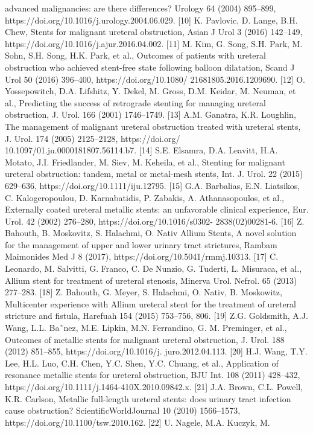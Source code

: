 advanced malignancies: are there differences? Urology 64 (2004) 895–899, https://doi.org/10.1016/j.urology.2004.06.029. [10] K. Pavlovic, D. Lange, B.H. Chew, Stents for malignant ureteral obstruction, Asian J Urol 3 (2016) 142–149, https://doi.org/10.1016/j.ajur.2016.04.002. [11] M. Kim, G. Song, S.H. Park, M. Sohn, S.H. Song, H.K. Park, et al., Outcomes of patients with ureteral obstruction who achieved stent-free state following balloon dilatation, Scand J Urol 50 (2016) 396–400, https://doi.org/10.1080/ 21681805.2016.1209690. [12] O. Yossepowitch, D.A. Lifshitz, Y. Dekel, M. Gross, D.M. Keidar, M. Neuman, et al., Predicting the success of retrograde stenting for managing ureteral obstruction, J. Urol. 166 (2001) 1746–1749. [13] A.M. Ganatra, K.R. Loughlin, The management of malignant ureteral obstruction treated with ureteral stents, J. Urol. 174 (2005) 2125–2128, https://doi.org/ 10.1097/01.ju.0000181807.56114.b7. [14] S.E. Elsamra, D.A. Leavitt, H.A. Motato, J.I. Friedlander, M. Siev, M. Keheila, et al., Stenting for malignant ureteral obstruction: tandem, metal or metal-mesh stents, Int. J. Urol. 22 (2015) 629–636, https://doi.org/10.1111/iju.12795. [15] G.A. Barbalias, E.N. Liatsikos, C. Kalogeropoulou, D. Karnabatidis, P. Zabakis, A. Athanasopoulos, et al., Externally coated ureteral metallic stents: an unfavorable clinical experience, Eur. Urol. 42 (2002) 276–280, https://doi.org/10.1016/s0302- 2838(02)00281-6. [16] Z. Bahouth, B. Moskovitz, S. Halachmi, O. Nativ Allium Stents, A novel solution for the management of upper and lower urinary tract strictures, Rambam Maimonides Med J 8 (2017), https://doi.org/10.5041/rmmj.10313. [17] C. Leonardo, M. Salvitti, G. Franco, C. De Nunzio, G. Tuderti, L. Misuraca, et al., Allium stent for treatment of ureteral stenosis, Minerva Urol. Nefrol. 65 (2013) 277–283. [18] Z. Bahouth, G. Meyer, S. Halachmi, O. Nativ, B. Moskowitz, Multicenter experience with Allium ureteral stent for the treatment of ureteral stricture and fistula, Harefuah 154 (2015) 753–756, 806. [19] Z.G. Goldsmith, A.J. Wang, L.L. Ba˜nez, M.E. Lipkin, M.N. Ferrandino, G. M. Preminger, et al., Outcomes of metallic stents for malignant ureteral obstruction, J. Urol. 188 (2012) 851–855, https://doi.org/10.1016/j. juro.2012.04.113. [20] H.J. Wang, T.Y. Lee, H.L. Luo, C.H. Chen, Y.C. Shen, Y.C. Chuang, et al., Application of resonance metallic stents for ureteral obstruction, BJU Int. 108 (2011) 428–432, https://doi.org/10.1111/j.1464-410X.2010.09842.x. [21] J.A. Brown, C.L. Powell, K.R. Carlson, Metallic full-length ureteral stents: does urinary tract infection cause obstruction? ScientificWorldJournal 10 (2010) 1566–1573, https://doi.org/10.1100/tsw.2010.162. [22] U. Nagele, M.A. Kuczyk, M.

